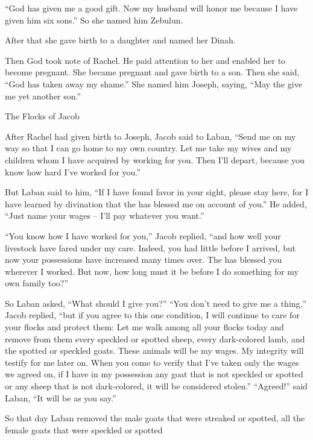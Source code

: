 {“God
has given
me a good
gift.
Now
my husband
will honor me
because
I have given
him six
sons.”
So she named
him Zebulun.
\par }{\PP {}After
that she gave birth
to a daughter
and named
her Dinah.
\par }{\PP {}Then God
took
note
of Rachel.
He
paid attention
to
her and enabled
her to become pregnant.
She became pregnant
and gave birth
to a son.
Then she said,
“God
has taken away
my shame.”
She
named
him Joseph,
saying,
“May
the {}
give me yet another
son.”
\par }{\SH The Flocks of Jacob
\par }{\PP {}After
Rachel
had
given birth
to Joseph,
Jacob
said
to
Laban,
“Send
me on my way so that I can go
home
to my own country.
Let
me take my wives
and my children
whom
I have acquired by working
for you. Then I’ll depart,
because
you
know
how hard
I’ve worked for you.”
\par }{\PP {}But Laban
said
to him,
“If
I have found
favor
in your sight,
please
stay here, for I have learned by divination
that the
{}
has blessed
me on account of you.”
He added,
“Just name
your wages
– I’ll pay whatever you want.”
\par }{\PP {}“You
know
how I have
worked
for you,” Jacob replied, “and how well
your livestock
have fared under my care.
Indeed,
you had little
before
I arrived, but now your
possessions have increased
many
times over. The
{}
has blessed
you wherever
I worked. But now,
how long
must it be
before I
do
something for my own family
too?”
\par }{\PP {}So Laban asked, “What
should I give
you?” “You don’t need to give
me a thing,” Jacob
replied, “but if
you agree
to this
one condition, I will continue to care
for your flocks
and protect them:
Let me walk among
all
your flocks
today
and remove
from them every
speckled
or spotted
sheep,
every
dark-colored
lamb,
and the spotted
or speckled
goats.
These animals will be
my wages.
My integrity
will testify
for me later on.
When you come
to verify that I’ve taken only the wages
we agreed on, if I have in my possession any
goat
that
is not
speckled
or spotted
or any sheep
that
is not dark-colored,
it will be considered stolen.”
“Agreed!” said
Laban,
“It will be
as you say.”
\par }{\PP {}So
that day
Laban removed
the male goats
that were streaked
or spotted,
all
the female goats
that were speckled
or spotted
}

